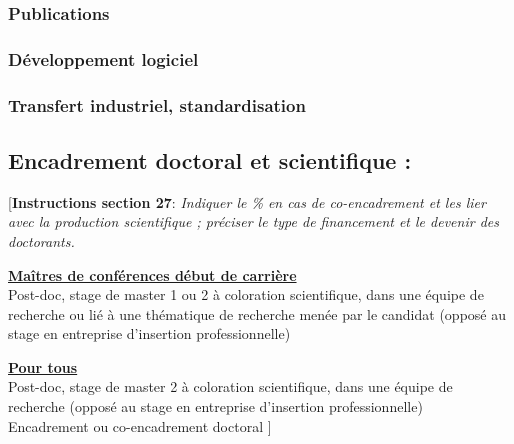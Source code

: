 \documentclass[a4paper,10pt]{article}
\newcommand{\instructionsSection}[1]{{\color{blue}[\textbf{Instructions section 27}: #1]}}
\newcommand{\instructionsSection}[1]{}
\begin{document}
\subsubsection{Publications}



\subsubsection{Développement logiciel}



\subsubsection{Transfert industriel, standardisation}



\subsection{Encadrement doctoral et scientifique :}

\instructionsSection{
\emph{Indiquer le \% en cas de co-encadrement et les lier avec la production scientifique ; préciser le type de financement et le devenir des doctorants.}

\bigskip

\underline{\textbf{Maîtres de conférences début de carrière}}\\
Post-doc, stage de master 1 ou 2 à coloration scientifique, dans une équipe de recherche ou lié à une thématique de recherche menée par le candidat (opposé au stage en entreprise d'insertion professionnelle)

\underline{\textbf{Pour tous}}\\
Post-doc, stage de master 2 à coloration scientifique, dans une équipe de recherche (opposé au stage en entreprise d'insertion professionnelle)\\
Encadrement ou co-encadrement doctoral
}


\end{document}
